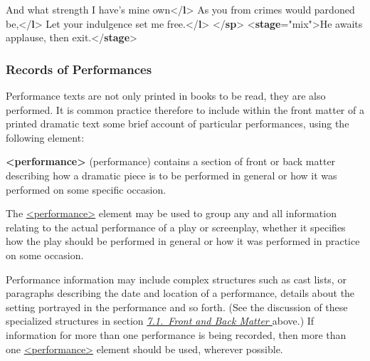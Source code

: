 \begin{shaded}
And what strength I have's mine own{</\textbf{l}>}\mbox{}\newline 
{}As you from crimes would pardoned be,{</\textbf{l}>}\mbox{}\newline 
{}Let your indulgence set me free.{</\textbf{l}>}\mbox{}\newline 
{</\textbf{sp}>}\mbox{}\newline 
{<\textbf{stage}\hspace*{1em}{type}="{mix}">}He awaits applause, then exit.{</\textbf{stage}>}\end{shaded}\egroup\par \noindent   
\subsubsection[{Records of Performances}]{Records of Performances}\label{DRPERF}\par
Performance texts are not only printed in books to be read, they are also performed. It is common practice therefore to include within the front matter of a printed dramatic text some brief account of particular performances, using the following element: 
\begin{sansreflist}
  
\item [\textbf{<performance>}] (performance) contains a section of front or back matter describing how a dramatic piece is to be performed in general or how it was performed on some specific occasion.
\end{sansreflist}
 The \hyperref[TEI.performance]{<performance>} element may be used to group any and all information relating to the actual performance of a play or screenplay, whether it specifies how the play should be performed in general or how it was performed in practice on some occasion.\par
Performance information may include complex structures such as cast lists, or paragraphs describing the date and location of a performance, details about the setting portrayed in the performance and so forth. (See the discussion of these specialized structures in section \textit{\hyperref[DRFAB]{7.1.\ Front and Back Matter }} above.) If information for more than one performance is being recorded, then more than one \hyperref[TEI.performance]{<performance>} element should be used, wherever possible.\par
